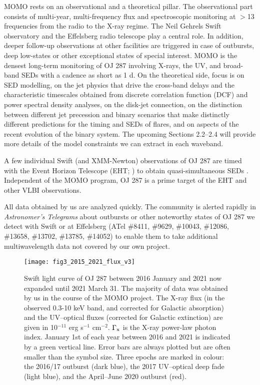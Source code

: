 \documentclass[preprints,article,accept,moreauthors,pdftex]{Definitions/mdpi}
\begin{document}
MOMO rests on an observational and a theoretical pillar. 
The observational part consists of multi-year, multi-frequency flux and spectroscopic monitoring at $>$13 frequencies from the radio to the X-ray regime.
The Neil Gehrels Swift observatory \citep[Swift hereafter;][]{Gehrels2004} and the Effelsberg radio telescope play a central role. 
In addition, deeper follow-up observations at other facilities are triggered in case of outbursts, deep low-states or other exceptional states of special interest. MOMO is the densest long-term monitoring of OJ 287 involving X-rays, the UV, 
and broad-band SEDs with a cadence as short as 1 d. 
On the theoretical side, focus is on SED modelling, on the jet physics that drive the cross-band delays and the characteristic timescales obtained from discrete correlation function (DCF) and power spectral density analyses, on the disk-jet connection, on the distinction between different jet precession and binary scenarios that make distinctly different predictions for the timing and SEDs of flares, and on aspects of the recent evolution of the binary system. The upcoming Sections 2.2--2.4 will provide more details of the 
model constraints we can extract in each waveband. 

A few individual Swift (and XMM-Newton) observations of OJ 287 are timed with the Event Horizon Telescope (EHT; \citep{EHT2019}) to obtain quasi-simultaneous SEDs \citep{Komossa2021a}. Independent of the MOMO program, OJ 287 is a prime target of the EHT and other VLBI observations. 

All data obtained by us are analyzed quickly. 
The community is alerted rapidly in {\sl{Astronomer's Telegrams}} about outbursts or other noteworthy states of OJ 287 we detect with Swift or at Effelsberg
(ATel \#8411, \#9629, \#10043, \#12086, \#13658, \#13702, \#13785, \#14052) to enable them to take additional multiwavelength data not covered by our own project. 

\begin{figure}
\centering
\texttt{[image: fig3\_2015\_2021\_flux\_v3]}
\caption{Swift light curve of OJ 287 between 2016 January and 2021 \citep{Komossa2017, Komossa2020, Komossa2021a} now expanded until 2021 March 31. The majority of data was obtained by us in the course of the MOMO project. 
The X-ray flux (in the observed 0.3-10 keV band, and corrected for Galactic absorption) and the UV--optical fluxes (corrected for Galactic extinction) are given in 10$^{-11}$ erg s$^{-1}$ cm$^{-2}$. $\Gamma_{\rm x}$ is the X-ray power-law photon index.
January 1st of each year between 2016 and 2021 is indicated by a green vertical line. Error bars are always plotted but are often smaller than the symbol size. Three epochs are marked in colour: the 2016/17 outburst (dark blue), the 2017 UV--optical deep fade (light blue), and the April--June 2020 outburst (red).  
}   
    \label{fig:lc-Swift-fluxes2016}
\end{figure}
\end{document}
